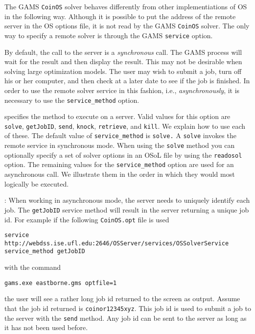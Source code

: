 The GAMS {\tt CoinOS} solver behaves differently from other implementiations of OS
in the following way.  
Although it is  possible to put the address of the remote server in the OS options file, it is not read 
by the GAMS {\tt CoinOS} solver. The only way to specify a remote solver is through the GAMS  
{\tt service} option.



By default, the call to the server is a {\it synchronous} call. The GAMS process will wait for the result 
and then display the result. This may not be desirable when solving large optimization models.  
The user may wish to submit a job, turn off his or her computer,  and then check at a later date to see 
if the job is finished.  In order to use the remote solver service in this fashion, i.e., 
{\it asynchronously}, it  is necessary to use the  {\tt service\_method} option.

\vskip 8pt
 specifies the method to execute on a server.  
Valid values for this option are {\tt solve}, {\tt getJobID}, {\tt send}, {\tt knock}, {\tt retrieve}, 
and {\tt kill}. We explain how to use each of these.
\vskip 8pt
The default value of {\tt service\_method} is {\tt solve.} A {\tt solve} invokes the remote service 
in synchronous mode. When using the {\tt solve} method you can optionally specify a set of solver options 
in an OSoL file  by using the {\tt readosol} option. The  remaining values for the {\tt service\_method} 
option are used for an asynchronous call.  We illustrate them in the order in which they would most 
logically be executed. 

\vskip 8pt
: When working in asynchronous mode, the server needs to 
uniquely identify each job. The {\tt getJobID} service method will result in the server returning 
a unique job id. For example if the following {\tt CoinOS.opt} file is used
\vskip 8pt
\begin{verbatim}
service http://webdss.ise.ufl.edu:2646/OSServer/services/OSSolverService
service_method getJobID
\end{verbatim}
with the command
\begin{verbatim}
gams.exe eastborne.gms optfile=1
\end{verbatim}
the user will see a rather long job id returned to the screen as output. Assume that the job id returned 
is {\tt coinor12345xyz}. This job id is used to submit a job to the server with the {\tt send} method.
Any job id can be sent to the server as long as it has not been used before.  

